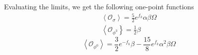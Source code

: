 \documentclass{article}
\begin{document}
Evaluating the limits, we get the following one-point functions
\[
\begin{array}{c}
\left\langle \mathcal{O}_{\sigma}\right\rangle=\frac{5}{2} e^{f_{k}} \alpha \beta \Omega \\
\left\langle \mathcal{O}_{\phi^{3}}\right\rbrace=\frac{1}{2} \beta
\end{array}
\]
\[
\left\langle \mathcal{O}_{\phi^{0}}\right\rangle =\frac{3}{2} e^{-f_{k}} \beta-\frac{15}{8} e^{f_{k}} \alpha^{2} \beta \Omega
\]
\end{document}
